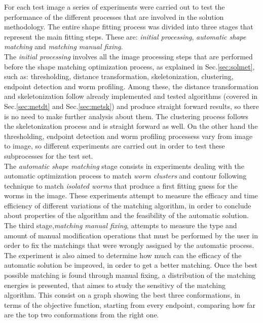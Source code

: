 For each test image a series of experiments were carried out to test the performance of
the different processes that are involved in the solution methodology. The entire 
shape fitting process was divided into three stages that represent the 
main fitting steps. These are: \emph{initial processing}, \emph{automatic shape matching} and
\emph{matching manual fixing}.\\

The \emph{initial processing} involves all the image processing steps that are performed 
before the shape matching optimization process, as explained in Sec.\ref{sec:solmet},
such as: thresholding, distance transformation, skeletonization, 
clustering, endpoint detection and worm profiling. Among these, the distance transformation
and skeletonization follow already implemented and tested algorithms (covered in Sec.\ref{sec:metdt}
and Sec.\ref{sec:metsk}) and produce straight forward results, so there is no need to make further analysis
about them.
The clustering process follows the skeletonization process and is straight forward as well.
On the other hand the thresholding, endpoint detection and worm profiling processess vary 
from image to image, so different experiments are carried out in order to test these subprocesses
for the test set.\\

The \emph{automatic shape matching} stage consists in experiments dealing with the automatic
optimization process to match \emph{worm clusters} and contour following technique to match 
\emph{isolated worms} that produce a first fitting guess for the worms in the image. These 
experiments attempt to measure the efficacy and time efficiency of different variations of the
matching algorithm, in order to conclude about properties of the algorithm and the feasibility 
of the automatic solution.\\
The third stage,\emph{matching manual fixing}, attempts to measure the type and amount of 
manual modification operations that must be performed by the user in order to fix the 
matchings that were wrongly assigned by the automatic process. The experiment is also 
aimed to determine how much can the efficacy of the automatic solution be improved, in
order to get a better matching. Once the best possible matching is found through manual fixing,
a distribution of the matching energies is presented, that aimes to study the sensitivy of the
matching algorithm. This consist on a graph showing the best three conformations, in terms of the objective
function, starting from every endpoint, comparing how far are the top two conformations from
the right one.\\

